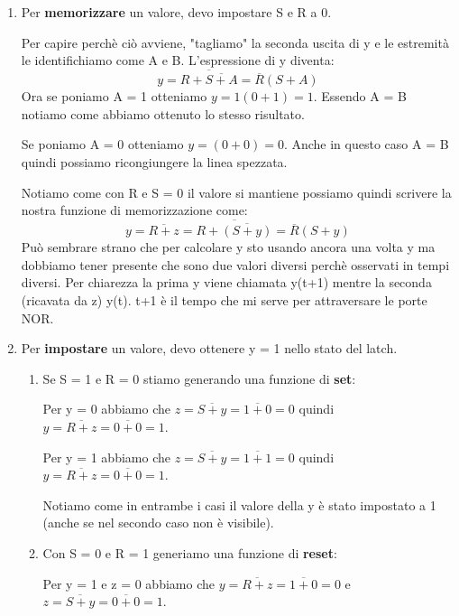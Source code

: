 \begin{enumerate}
    \item Per \textbf{memorizzare} un valore, devo impostare S e R a 0.
    
    Per capire perchè ciò avviene, "tagliamo" la seconda uscita di y e le estremità le identifichiamo come A e B.
    L'espressione di y diventa:
    \begin{equation*}
        y=\overline{R+\overline{S+A}}=\overline{R}(S+A)
    \end{equation*}
    Ora se poniamo A = 1 otteniamo $y=1(0+1)=1$. Essendo A = B notiamo come abbiamo ottenuto lo stesso risultato.
    
    Se poniamo A = 0 otteniamo $y=(0+0)=0$. Anche in questo caso A = B quindi possiamo ricongiungere la linea spezzata.
    
    Notiamo come con R e S = 0 il valore si mantiene possiamo quindi scrivere la nostra funzione di memorizzazione come:
    \begin{equation}\label{eq:ylatchSR}
        y=\overline{R+z}=\overline{R+\overline{(S+y)}}=\overline{R}(S+y)
    \end{equation}
    Può sembrare strano che per calcolare y sto usando ancora una volta y ma dobbiamo tener presente che sono due valori diversi perchè osservati in tempi diversi. Per chiarezza la prima y viene chiamata y(t+1) mentre la seconda (ricavata da z) y(t). t+1 è il tempo che mi serve per attraversare le porte NOR.
    
    \item Per \textbf{impostare} un valore, devo ottenere y = 1 nello stato del latch.
    \begin{enumerate}
        \item Se S = 1 e R = 0 stiamo generando una funzione di \textbf{set}:
        
        Per y = 0 abbiamo che $z=\overline{S+y}=\overline{1+0}=0$ quindi $y=\overline{R+z}=\overline{0+0}=1$.
        
        Per y = 1 abbiamo che $z=\overline{S+y}=\overline{1+1}=0$ quindi $y=\overline{R+z}=\overline{0+0}=1$.
        
        Notiamo come in entrambe i casi il valore della y è stato impostato a 1 (anche se nel secondo caso non è visibile).
        
        \item Con S = 0 e R = 1 generiamo una funzione di \textbf{reset}:
        
        Per y = 1 e z = 0 abbiamo che $y=\overline{R+z}=\overline{1+0}=0$ e $z=\overline{S+y}=\overline{0+0}=1$.
        

\end{enumerate}
\end{enumerate}
